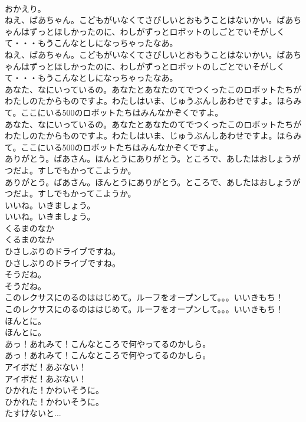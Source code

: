 \documentclass[8pt]{extreport}
\begin{document}
\begin{CJK}{UTF8}{min}
\\	おかえり。 
\\	ねえ、ばあちゃん。こどもがいなくてさびしいとおもうことはないかい。ばあちゃんはずっとほしかったのに、わしがずっとロボットのしごとでいそがしくて・・・もうこんなとしになっちゃったなあ。	
\\	ねえ、ばあちゃん。こどもがいなくてさびしいとおもうことはないかい。ばあちゃんはずっとほしかったのに、わしがずっとロボットのしごとでいそがしくて・・・もうこんなとしになっちゃったなあ。 
\\	あなた、なにいっているの。あなたとあなたのてでつくったこのロボットたちがわたしのたからものですよ。わたしはいま、じゅうぶんしあわせですよ。ほらみて。ここにいる500のロボットたちはみんなかぞくですよ。	
\\	あなた、なにいっているの。あなたとあなたのてでつくったこのロボットたちがわたしのたからものですよ。わたしはいま、じゅうぶんしあわせですよ。ほらみて。ここにいる500のロボットたちはみんなかぞくですよ。 
\\	ありがとう。ばあさん。ほんとうにありがとう。ところで、あしたはおしょうがつだよ。すしでもかってこようか。	
\\	ありがとう。ばあさん。ほんとうにありがとう。ところで、あしたはおしょうがつだよ。すしでもかってこようか。 
\\	いいね。いきましょう。	
\\	いいね。いきましょう。 
\\	くるまのなか
\\	くるまのなか
\\	ひさしぶりのドライブですね。	
\\	ひさしぶりのドライブですね。 
\\	そうだね。	
\\	そうだね。 
\\	このレクサスにのるのははじめて。ルーフをオープンして。。。いいきもち！	
\\	このレクサスにのるのははじめて。ルーフをオープンして。。。いいきもち！ 
\\	ほんとに。	
\\	ほんとに。 
\\	あっ！あれみて！こんなところで何やってるのかしら。	
\\	あっ！あれみて！こんなところで何やってるのかしら。 
\\	アイボだ！あぶない！	
\\	アイボだ！あぶない！ 
\\	ひかれた！かわいそうに。	
\\	ひかれた！かわいそうに。 
\\	たすけないと...	

\end{CJK}
\end{document}
